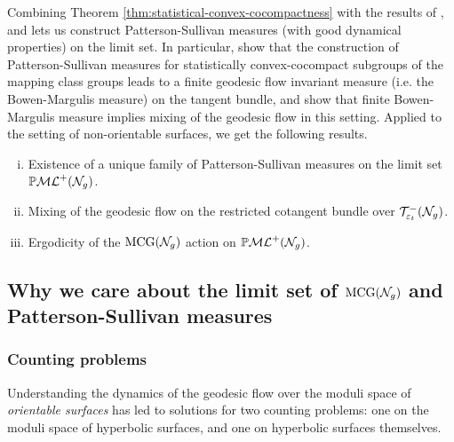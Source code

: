 Combining Theorem \ref{thm:statistical-convex-cocompactness} with the results of \textcite{gekhtman2023dynamics}, and \textcite{CGTY} lets us construct Patterson-Sullivan measures (with good dynamical properties) on the limit set.
In particular, \textcite{CGTY} show that the construction of Patterson-Sullivan measures for statistically convex-cocompact subgroups of the mapping class groups leads to a finite geodesic flow invariant measure (i.e. the Bowen-Margulis measure) on the tangent bundle, and \textcite{gekhtman2023dynamics} show that finite Bowen-Margulis measure implies mixing of the geodesic flow in this setting.
Applied to the setting of non-orientable surfaces, we get the following results.
\begin{enumerate}[(i)]
\item Existence of a unique family of Patterson-Sullivan measures on the limit set $\mathbb{P}\mathcal{ML}^+(\mathcal{N}_g)$.
\item Mixing of the geodesic flow on the restricted cotangent bundle over $\mathcal{T}_{\varepsilon_t}^{-}(\mathcal{N}_g)$.
\item Ergodicity of the $\mathrm{MCG}(\mathcal{N}_g)$ action on $\mathbb{P}\mathcal{ML}^+(\mathcal{N}_g)$.
\end{enumerate}

\subsection*{Why we care about the limit set of $\mathrm{MCG}(\mathcal{N}_g)$ and Patterson-Sullivan measures}

\subsubsection*{Counting problems}

Understanding the dynamics of the geodesic flow over the moduli space of \emph{orientable surfaces} has led to solutions for two counting problems: one on the moduli space of hyperbolic surfaces, and one on hyperbolic surfaces themselves.

